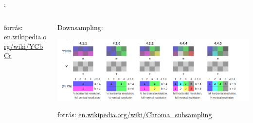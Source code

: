 \documentclass{beamer}
\begin{document}
\begin{frame}{\secname : \subsecname}
\begin{columns}
\begin{column}{0.3\textwidth}
\begin{footnotesize}
    forrás: \url{en.wikipedia.org/wiki/YCbCr}
\end{footnotesize}
\end{column}
\begin{column}{0.7\textwidth}

Downsampling:

\includegraphics[scale=0.3]{figures/Downsampling.png}

\begin{footnotesize}
    forrás: \url{en.wikipedia.org/wiki/Chroma\_subsampling}
\end{footnotesize}

\end{column}
\end{columns}

\end{frame}
\end{document}

